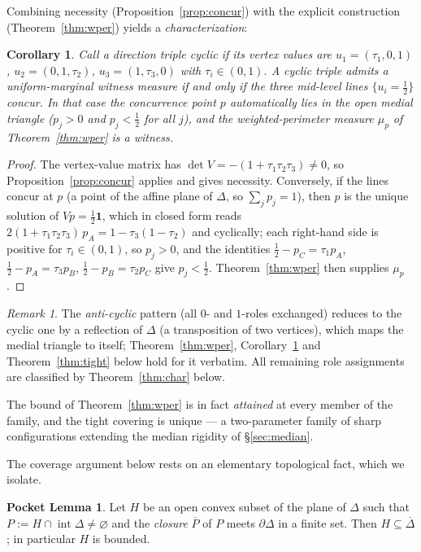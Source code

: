 \documentclass{aims}
\numberwithin{equation}{section}
\theoremstyle{plain}
\newtheorem{corollary}[theorem]{Corollary}
\theoremstyle{definition}
\newtheorem*{pocketlemma}{Pocket Lemma}
\theoremstyle{remark}
\newtheorem{remark}[theorem]{Remark}
\begin{document}
Combining necessity (Proposition~\ref{prop:concur}) with the explicit construction
(Theorem~\ref{thm:wper}) yields a \emph{characterization}:
\begin{corollary}\label{cor:iff}
Call a direction triple \emph{cyclic} if its vertex values are
$u_1=(\tau_1,0,1)$, $u_2=(0,1,\tau_2)$, $u_3=(1,\tau_3,0)$ with
$\tau_i\in(0,1)$. A cyclic triple admits a uniform-marginal witness measure if and
only if the three mid-level lines $\{u_i=\tfrac12\}$ concur. In that case the
concurrence point $p$ automatically lies in the open medial triangle
($p_j>0$ and $p_j<\tfrac12$ for all $j$), and the weighted-perimeter measure
$\mu_p$ of Theorem~\ref{thm:wper} is a witness.
\end{corollary}
\begin{proof}
The vertex-value matrix has $\det V=-(1+\tau_1\tau_2\tau_3)\ne0$, so
Proposition~\ref{prop:concur} applies and gives necessity. Conversely, if the lines
concur at $p$ (a point of the affine plane of $\Delta$, so $\sum_jp_j=1$), then $p$
is the unique solution of $Vp=\tfrac12\mathbf1$, which in closed form reads
$2(1+\tau_1\tau_2\tau_3)\,p_A=1-\tau_3(1-\tau_2)$ and cyclically; each right-hand
side is positive for $\tau_i\in(0,1)$, so $p_j>0$, and the identities
$\tfrac12-p_C=\tau_1p_A$, $\tfrac12-p_A=\tau_3p_B$, $\tfrac12-p_B=\tau_2p_C$ give
$p_j<\tfrac12$. Theorem~\ref{thm:wper} then supplies $\mu_p$.
\end{proof}
\begin{remark}
The \emph{anti-cyclic} pattern (all $0$- and $1$-roles exchanged) reduces to the
cyclic one by a reflection of $\Delta$ (a transposition of two vertices), which
maps the medial triangle to itself; Theorem~\ref{thm:wper},
Corollary~\ref{cor:iff} and Theorem~\ref{thm:tight} below hold for it verbatim.
All remaining role assignments are classified by Theorem~\ref{thm:char} below.
\end{remark}

The bound of Theorem~\ref{thm:wper} is in fact \emph{attained} at every member
of the family, and the tight covering is unique --- a two-parameter family of
sharp configurations extending the median rigidity of \S\ref{sec:median}.

The coverage argument below rests on an elementary topological fact, which we
isolate.

\begin{pocketlemma}
Let $H$ be an open convex subset of the plane of $\Delta$ such that
$P:=H\cap\operatorname{int}\Delta\ne\varnothing$ and the \emph{closure}
$\overline P$ of $P$ meets $\partial\Delta$ in a finite set. Then
$H\subseteq\overline\Delta$; in particular $H$ is bounded.
\end{pocketlemma}
\end{document}
